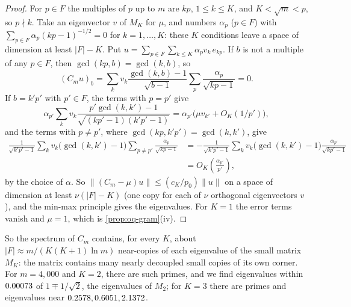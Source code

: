 \begin{proof}
For $p \in F$ the multiples of $p$ up to $m$ are $kp$, $1 \le k \le K$, and $K < \sqrt m < p$, so $p \nmid k$. Take an eigenvector $v$ of $M_K$ for $\mu$, and numbers $\alpha_p$ ($p \in F$) with $\sum_{p \in F}\alpha_p(kp - 1)^{-1/2} = 0$ for $k = 1, \dots, K$: these $K$ conditions leave a space of dimension at least $|F| - K$. Put $u = \sum_{p \in F}\sum_{k \le K}\alpha_p v_k\, e_{kp}$. If $b$ is not a multiple of any $p \in F$, then $\gcd(kp, b) = \gcd(k, b)$, so
\[
  (C_m u)_b = \sum_{k}v_k\frac{\gcd(k,b) - 1}{\sqrt{b-1}}\sum_{p}\frac{\alpha_p}{\sqrt{kp-1}} = 0.
\]
If $b = k'p'$ with $p' \in F$, the terms with $p = p'$ give
\[
  \alpha_{p'}\sum_k v_k\frac{p'\gcd(k,k') - 1}{\sqrt{(kp'-1)(k'p'-1)}} = \alpha_{p'}\bigl(\mu v_{k'} + O_K(1/p')\bigr),
\]
and the terms with $p \ne p'$, where $\gcd(kp, k'p') = \gcd(k,k')$, give
\begin{align*}
  \frac{1}{\sqrt{k'p'-1}}\sum_k v_k\bigl(\gcd(k,k') - 1\bigr)\sum_{p \ne p'}\frac{\alpha_p}{\sqrt{kp-1}}
  &= -\frac{1}{\sqrt{k'p'-1}}\sum_k v_k\bigl(\gcd(k,k')-1\bigr)\frac{\alpha_{p'}}{\sqrt{kp'-1}}\\
  &= O_K\!\left(\frac{\alpha_{p'}}{p'}\right),
\end{align*}
by the choice of $\alpha$. So $\|(C_m - \mu)u\| \le (c_K/p_0)\|u\|$ on a space of dimension at least $\nu(|F| - K)$ (one copy for each of $\nu$ orthogonal eigenvectors $v$), and the min-max principle gives the eigenvalues. For $K = 1$ the error terms vanish and $\mu = 1$, which is \cref{prop:oq-gram}(iv).
\end{proof}

So the spectrum of $C_m$ contains, for every $K$, about $|F| \approx m/(K(K+1)\ln m)$ near-copies of each eigenvalue of the small matrix $M_K$: the matrix contains many nearly decoupled small copies of its own corner. For $m = 4{,}000$ and $K = 2$, there are \ObFtwo{} such primes, and we find \ObFtwoFound{} eigenvalues within $0.00073$ of $1 \mp 1/\sqrt 2$, the eigenvalues of $M_2$; for $K = 3$ there are \ObFthree{} primes and \ObFthreeFound{} eigenvalues near $0.2578, 0.6051, 2.1372$.

